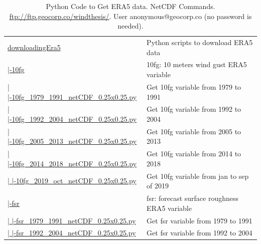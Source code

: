 \documentclass[12pt,oneside]{reedthesis}
\begin{document}
\begingroup\fontsize{8}{10}\selectfont
\begin{longtable}[t]{>{\raggedright\arraybackslash}p{2.3in}>{\raggedright\arraybackslash}p{3in}}
\caption[Python Code to Get ERA5 data. NetCDF Commands]{\label{tab:pythonera5}Python Code to Get ERA5 data. NetCDF Commands.  \href{ftp://ftp.geocorp.co/windthesis/}{ftp://ftp.geocorp.co/windthesis/}. User anonymous@geocorp.co (no password is needed).}\\
\toprule
\multicolumn{1}{l}{Folder Tree - Ftp Links} & \multicolumn{1}{l}{Description}\\
\midrule
\href{ftp://ftp.geocorp.co/windthesis/downloadingEra5/}{downloadingEra5} & Python scripts to download ERA5 data\\
\href{ftp://ftp.geocorp.co/windthesis/downloadingEra5/10fg/}{  |-10fg} & 10fg: 10 meters wind gust ERA5 variable\\
\href{ftp://ftp.geocorp.co/windthesis/downloadingEra5/10fg/10fg_1979_1991_netCDF_0.25x0.25.py}{  |    |-10fg\_1979\_1991\_netCDF\_0.25x0.25.py} & Get 10fg variable from 1979 to 1991\\
\href{ftp://ftp.geocorp.co/windthesis/downloadingEra5/10fg/10fg_1992_2004_netCDF_0.25x0.25.py}{  |    |-10fg\_1992\_2004\_netCDF\_0.25x0.25.py} & Get 10fg variable from 1992 to 2004\\
\href{ftp://ftp.geocorp.co/windthesis/downloadingEra5/10fg/10fg_2005_2013_netCDF_0.25x0.25.py}{  |    |-10fg\_2005\_2013\_netCDF\_0.25x0.25.py} & Get 10fg variable from 2005 to 2013\\
\href{ftp://ftp.geocorp.co/windthesis/downloadingEra5/10fg/10fg_2014_2018_netCDF_0.25x0.25.py}{  |    |-10fg\_2014\_2018\_netCDF\_0.25x0.25.py} & Get 10fg variable from 2014 to 2018\\
\href{ftp://ftp.geocorp.co/windthesis/downloadingEra5/10fg/10fg_2019_oct_netCDF_0.25x0.25.py}{  |    |-10fg\_2019\_oct\_netCDF\_0.25x0.25.py} & Get 10fg variable from jan to sep of 2019\\
\href{ftp://ftp.geocorp.co/windthesis/downloadingEra5/fsr/}{  |-fsr} & fsr: forecast surface roughness ERA5 variable\\
\href{ftp://ftp.geocorp.co/windthesis/downloadingEra5/fsr/fsr_1979_1991_netCDF_0.25x0.25.py}{  |    |-fsr\_1979\_1991\_netCDF\_0.25x0.25.py} & Get fsr variable from 1979 to 1991\\
\href{ftp://ftp.geocorp.co/windthesis/downloadingEra5/fsr/fsr_1992_2004_netCDF_0.25x0.25.py}{  |    |-fsr\_1992\_2004\_netCDF\_0.25x0.25.py} & Get fsr variable from 1992 to 2004\\

\end{longtable}
\end{document}
